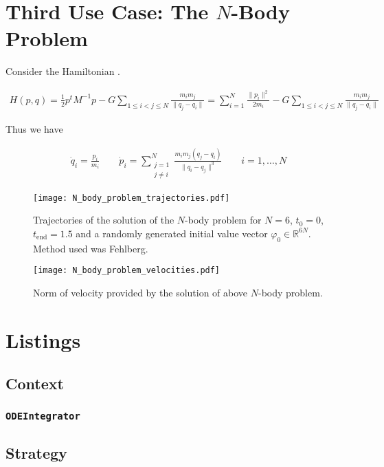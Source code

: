\section{Third Use Case: The $N$-Body Problem}
Consider the Hamiltonian \cite[10]{N_Body_MEYER}.

\begin{gather}
	\boxed{H(p,q) = \frac{1}{2}p^tM^{-1}p - G \sum\limits_{1 \leqslant i < j \leqslant N} \frac{m_i m_j}{\|q_j - q_i\|} = \sum\limits_{i = 1}^N \frac{\|p_i\|^2}{2m_i} - G \sum\limits_{1 \leqslant i < j \leqslant N} \frac{m_i m_j}{\|q_j - q_i\|}} 
\end{gather}

Thus we have

\begin{gather}
	\dot{q}_i = \frac{p_i}{m_i} \qquad \dot{p}_i = \sum\limits_{\substack{j = 1\\j \neq i}}^N \frac{m_im_j(q_j - q_i)}{\|q_i - q_j\|^3} \qquad i = 1,\hdots,N
\end{gather}

\begin{figure}[h!tb]
	\centering
	\texttt{[image: N\_body\_problem\_trajectories.pdf]}
	\caption[$N$-body problem trajectories]{Trajectories of the solution of the $N$-body problem for $N = 6$, $t_0 = 0$, $t_{\mathrm{end}} = 1.5$ and a randomly generated initial value vector $\varphi_0 \in \mathbb{R}^{6N}$. Method used was Fehlberg.}
\end{figure}

\begin{figure}[h!tb]
	\centering
	\texttt{[image: N\_body\_problem\_velocities.pdf]}
	\caption[$N$-body problem velocities]{Norm of velocity provided by the solution of above $N$-body problem.}
\end{figure}

\printbibliography

\section{Listings}
	\subsection{Context}
		\subsubsection{\texttt{ODEIntegrator}}
	\subsection{Strategy}
